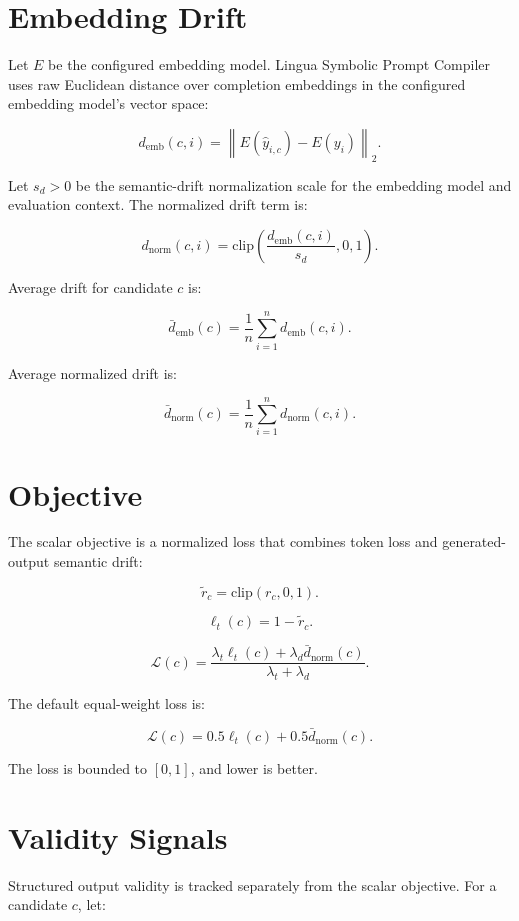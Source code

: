 \documentclass[11pt]{article}
\begin{document}
\section{Embedding Drift}

Let \(E\) be the configured embedding model. Lingua Symbolic Prompt Compiler uses
raw Euclidean distance over completion embeddings in the configured embedding
model's vector space:

\[
d_{\mathrm{emb}}(c, i) =
\left\| E(\hat{y}_{i,c}) - E(y_i) \right\|_2.
\]

Let \(s_d > 0\) be the semantic-drift normalization scale for the embedding
model and evaluation context. The normalized drift term is:

\[
d_{\mathrm{norm}}(c, i) =
\mathrm{clip}\left(\frac{d_{\mathrm{emb}}(c, i)}{s_d}, 0, 1\right).
\]

Average drift for candidate \(c\) is:

\[
\bar{d}_{\mathrm{emb}}(c) =
\frac{1}{n}\sum_{i=1}^{n} d_{\mathrm{emb}}(c, i).
\]

Average normalized drift is:

\[
\bar{d}_{\mathrm{norm}}(c) =
\frac{1}{n}\sum_{i=1}^{n} d_{\mathrm{norm}}(c, i).
\]

\section{Objective}

The scalar objective is a normalized loss that combines token loss and
generated-output semantic drift:

\[
\tilde{r}_c = \mathrm{clip}(r_c, 0, 1).
\]

\[
\ell_t(c) = 1 - \tilde{r}_c.
\]

\[
\mathcal{L}(c) =
\frac{\lambda_t \ell_t(c) + \lambda_d \bar{d}_{\mathrm{norm}}(c)}
     {\lambda_t + \lambda_d}.
\]

The default equal-weight loss is:

\[
\mathcal{L}(c) =
0.5 \ell_t(c) + 0.5 \bar{d}_{\mathrm{norm}}(c).
\]

The loss is bounded to \([0, 1]\), and lower is better.

\section{Validity Signals}

Structured output validity is tracked separately from the scalar objective.
For a candidate \(c\), let:
\end{document}
